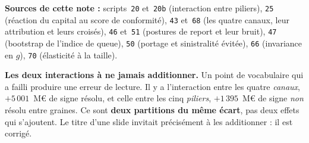\documentclass[11pt,a4paper]{article}
\begin{document}
\vspace{0.15cm}
{\scriptsize\noindent\textbf{Sources de cette note :} scripts~\texttt{20} et~\texttt{20b}
(interaction entre piliers), \texttt{25} (réaction du capital au score de conformité),
\texttt{43} et~\texttt{68} (les quatre canaux, leur attribution et leurs croisés),
\texttt{46} et~\texttt{51} (postures de report et leur bruit), \texttt{47} (bootstrap de
l'indice de queue), \texttt{50} (portage et sinistralité évitée), \texttt{66} (invariance en
$g$), \texttt{70} (élasticité à la taille).\par}

\vspace{0.2cm}
\begin{cle}
\textbf{Les deux interactions à ne jamais additionner.} Un point de vocabulaire qui a failli
produire une erreur de lecture. Il y a l'interaction entre les quatre \emph{canaux},
$+5\,001$~M\euro{} de signe résolu, et celle entre les cinq \emph{piliers}, $+1\,395$~M\euro{} de
signe \emph{non} résolu entre graines. Ce sont \textbf{deux partitions du même écart}, pas deux
effets qui s'ajoutent. Le titre d'une slide invitait précisément à les additionner : il est
corrigé.
\end{cle}
\end{document}
